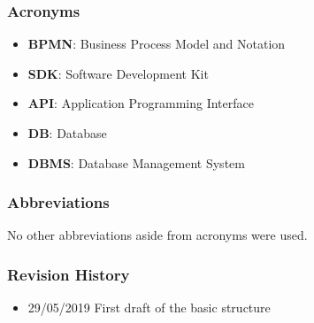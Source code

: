 \subsubsection{Acronyms}
\begin{itemize}
\item \textbf{BPMN}: Business Process Model and Notation
\item \textbf{SDK}: Software Development Kit
\item \textbf{API}: Application Programming Interface
\item \textbf{DB}: Database
\item \textbf{DBMS}: Database Management System
\end{itemize}
\subsubsection{Abbreviations}
No other abbreviations aside from acronyms were used.
\subsubsection{Revision History}
\begin{itemize}
\item 29/05/2019 First draft of the basic structure
\end{itemize}
